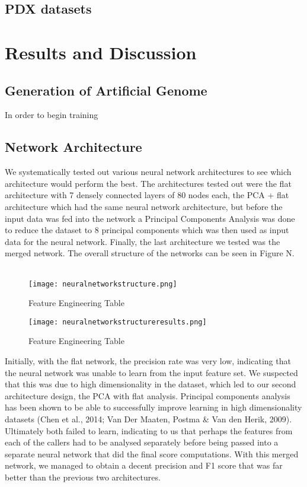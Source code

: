 \documentclass{article}
\begin{document}
\subsection{PDX datasets}


\section{Results and Discussion}
\subsection{Generation of Artificial Genome}
In order to begin training 



\subsection{Network Architecture}
We systematically tested out various neural network architectures to see which architecture would perform the best. The architectures tested out were the flat architecture with 7 densely connected layers of 80 nodes each, the PCA + flat architecture which had the same neural network architecture, but before the input data was fed into the network a Principal Components Analysis was done to reduce the dataset to 8 principal components which was then used as input data for the neural network. Finally, the last architecture we tested was the merged network. The overall structure of the networks can be seen in Figure N. \\\\

\begin{figure}[H]
\caption{Feature Engineering Table}
\texttt{[image: neuralnetworkstructure.png]}
\centering
\end{figure}

\begin{figure}[H]
\caption{Feature Engineering Table}
\texttt{[image: neuralnetworkstructureresults.png]}
\centering
\end{figure}
Initially, with the flat network, the precision rate was very low, indicating that the neural network was unable to learn from the input feature set. We suspected that this was due to high dimensionality in the dataset, which led to our second architecture design, the PCA with flat analysis. Principal components analysis has been shown to be able to successfully improve learning in high dimensionality datasets (Chen et al., 2014; Van Der Maaten, Postma \& Van den Herik, 2009). Ultimately both failed to learn, indicating to us that perhaps the features from each of the callers had to be analysed separately before being passed into a separate neural network that did the final score computations. With this merged network, we managed to obtain a decent precision and F1 score that was far better than the previous two architectures. 
\end{document}
